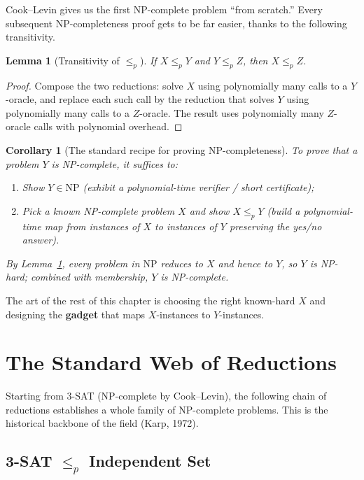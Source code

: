 \documentclass[11pt]{article}
\newtheorem{lemma}[theorem]{Lemma}
\newtheorem{corollary}[theorem]{Corollary}
\begin{document}
Cook--Levin gives us the first NP-complete problem ``from scratch.'' Every subsequent
NP-completeness proof gets to be far easier, thanks to the following transitivity.

\begin{lemma}[Transitivity of $\le_p$]
\label{lem:transitive}
If $X \le_p Y$ and $Y \le_p Z$, then $X \le_p Z$.
\end{lemma}

\begin{proof}
Compose the two reductions: solve $X$ using polynomially many calls to a $Y$-oracle, and
replace each such call by the reduction that solves $Y$ using polynomially many calls to a
$Z$-oracle. The result uses polynomially many $Z$-oracle calls with polynomial overhead.
\end{proof}

\begin{corollary}[The standard recipe for proving NP-completeness]
\label{cor:recipe}
To prove that a problem $Y$ is NP-complete, it suffices to:
\begin{enumerate}[label=(\arabic*)]
    \item Show $Y \in \mathrm{NP}$ (exhibit a polynomial-time verifier / short certificate);
    \item Pick a \emph{known} NP-complete problem $X$ and show $X \le_p Y$ (build a
    polynomial-time map from instances of $X$ to instances of $Y$ preserving the yes/no
    answer).
\end{enumerate}
By Lemma~\ref{lem:transitive}, every problem in $\mathrm{NP}$ reduces to $X$ and hence to
$Y$, so $Y$ is NP-hard; combined with membership, $Y$ is NP-complete.
\end{corollary}

The art of the rest of this chapter is choosing the right known-hard $X$ and designing the
\textbf{gadget} that maps $X$-instances to $Y$-instances.

\section{The Standard Web of Reductions}

Starting from \textsc{3-SAT} (NP-complete by Cook--Levin), the following chain of
reductions establishes a whole family of NP-complete problems. This is the historical
backbone of the field (Karp, 1972).

\subsection{3-SAT \texorpdfstring{$\le_p$}{<=p} Independent Set}
\end{document}
